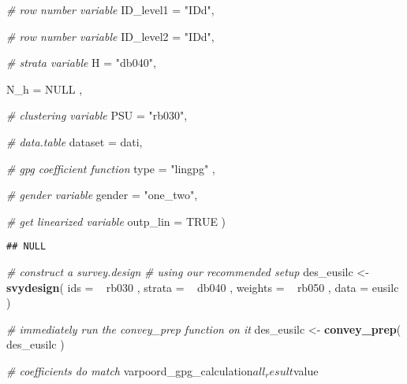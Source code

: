 \documentclass[]{book}
\newenvironment{Shaded}{\begin{snugshade}}{\end{snugshade}}
\newcommand{\KeywordTok}[1]{\textcolor[rgb]{0.13,0.29,0.53}{\textbf{{#1}}}}
\newcommand{\DataTypeTok}[1]{\textcolor[rgb]{0.13,0.29,0.53}{{#1}}}
\newcommand{\StringTok}[1]{\textcolor[rgb]{0.31,0.60,0.02}{{#1}}}
\newcommand{\CommentTok}[1]{\textcolor[rgb]{0.56,0.35,0.01}{\textit{{#1}}}}
\newcommand{\OtherTok}[1]{\textcolor[rgb]{0.56,0.35,0.01}{{#1}}}
\newcommand{\NormalTok}[1]{{#1}}
\theoremstyle{definition}
\theoremstyle{definition}
\theoremstyle{remark}
\begin{document}
\begin{Shaded}
\begin{Highlighting}[]
        \CommentTok{# row number variable}
        \DataTypeTok{ID_level1 =} \StringTok{"IDd"}\NormalTok{,}
        
        \CommentTok{# row number variable}
        \DataTypeTok{ID_level2 =} \StringTok{"IDd"}\NormalTok{,}
        
        \CommentTok{# strata variable}
        \DataTypeTok{H =} \StringTok{"db040"}\NormalTok{, }
        
        \DataTypeTok{N_h =} \OtherTok{NULL} \NormalTok{,}
        
        \CommentTok{# clustering variable}
        \DataTypeTok{PSU =} \StringTok{"rb030"}\NormalTok{, }
        
        \CommentTok{# data.table}
        \DataTypeTok{dataset =} \NormalTok{dati, }
        
        \CommentTok{# gpg coefficient function}
        \DataTypeTok{type =} \StringTok{"lingpg"} \NormalTok{,}
        
        \CommentTok{# gender variable}
        \DataTypeTok{gender =} \StringTok{"one_two"}\NormalTok{,}
      
      \CommentTok{# get linearized variable}
      \DataTypeTok{outp_lin =} \OtherTok{TRUE}
    \NormalTok{)}
\end{Highlighting}
\end{Shaded}

\begin{verbatim}
## NULL
\end{verbatim}

\begin{Shaded}
\begin{Highlighting}[]
\CommentTok{# construct a survey.design}
\CommentTok{# using our recommended setup}
\NormalTok{des_eusilc <-}\StringTok{ }
\StringTok{    }\KeywordTok{svydesign}\NormalTok{( }
        \DataTypeTok{ids =} \NormalTok{~}\StringTok{ }\NormalTok{rb030 , }
        \DataTypeTok{strata =} \NormalTok{~}\StringTok{ }\NormalTok{db040 ,  }
        \DataTypeTok{weights =} \NormalTok{~}\StringTok{ }\NormalTok{rb050 , }
        \DataTypeTok{data =} \NormalTok{eusilc}
    \NormalTok{)}

\CommentTok{# immediately run the convey_prep function on it}
\NormalTok{des_eusilc <-}\StringTok{ }\KeywordTok{convey_prep}\NormalTok{( des_eusilc )}

\CommentTok{# coefficients do match}
\NormalTok{varpoord_gpg_calculation$all_result$value}
\end{Highlighting}
\end{Shaded}
\end{document}
